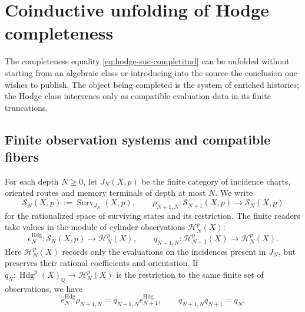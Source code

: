 
\section{Coinductive unfolding of Hodge completeness}
\label{sec:amp-hodge-completitud-desplegada}

The completeness equality
\eqref{eq:hodge-suc-completitud} can be unfolded without starting from an algebraic
class or introducing into the source the conclusion one wishes to publish. The
object being completed is the system of enriched histories; the Hodge
class intervenes only as compatible evaluation data in its
finite truncations.

\subsection{Finite observation systems and compatible fibers}
\label{subsec:amp-hodge-sistemas-finitos}

For each depth \(N\geq0\), let \(J_N(X,p)\) be the finite category of
incidence charts, oriented routes and memory terminals of depth at
most \(N\). We write
\begin{equation}\label{eq:amp-hodge-surv-n}
 \mathscr S_N(X,p):=\operatorname{Surv}_{J_N}(X,p),
 \qquad
 \rho_{N+1,N}:\mathscr S_{N+1}(X,p)\longrightarrow\mathscr S_N(X,p)
\end{equation}
for the rationalized space of surviving states and its restriction. The
finite readers take values in the module of cylinder observations
\(\mathscr H_N^p(X)\):
\begin{equation}\label{eq:amp-hodge-evaluacion-finita}
 e_N^{\mathrm{Hdg}}:\mathscr S_N(X,p)\longrightarrow
 \mathscr H_N^p(X),
 \qquad
 q_{N+1,N}:\mathscr H_{N+1}^p(X)\longrightarrow\mathscr H_N^p(X).
\end{equation}
Here \(\mathscr H_N^p(X)\) records only the evaluations on the incidences
present in \(J_N\), but preserves their rational coefficients and
orientation. If
\(q_N:\operatorname{Hdg}^p(X)_{\mathbb Q}\to\mathscr H_N^p(X)\) is the
restriction to the same finite set of observations, we have
\begin{equation}\label{eq:amp-hodge-cuadrado-restriccion}
 e_N^{\mathrm{Hdg}}\rho_{N+1,N}
 =q_{N+1,N}e_{N+1}^{\mathrm{Hdg}},
 \qquad
 q_{N+1,N}q_{N+1}=q_N.
\end{equation}


